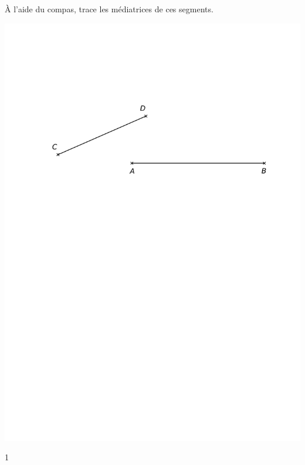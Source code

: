 \documentclass[a4paper,11pt]{report}
\begin{document}
\begin{exop}
{
À l'aide du compas, trace les médiatrices de ces segments.
\begin{center}
	\includegraphics[scale=1]{media/es-10/12-8}
\end{center}
\vspace{2cm}

%
%
}
{1}
\end{exop}
\end{document}
